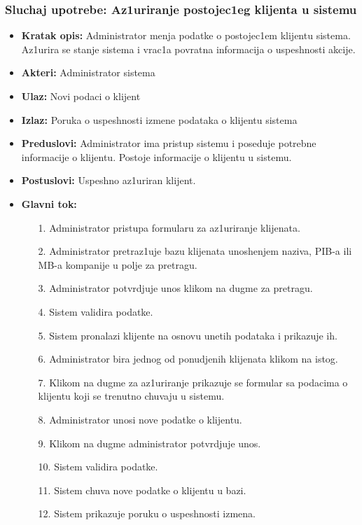 \subsubsection{Sluchaj upotrebe: Az1uriranje postojec1eg klijenta u sistemu}

\begin{itemize}
\item{\textbf{Kratak opis:} Administrator menja podatke o postojec1em klijentu sistema. Az1urira se stanje sistema i vrac1a povratna informacija o uspeshnosti akcije.}
\item{\textbf{Akteri:} Administrator sistema}
\item{\textbf{Ulaz:} Novi podaci o klijent }
\item{\textbf{Izlaz:} Poruka o uspeshnosti izmene podataka o  klijentu sistema }
\item{\textbf{Preduslovi:} Administrator ima pristup sistemu i poseduje potrebne informacije o klijentu. Postoje informacije o klijentu u sistemu.}
\item{\textbf{Postuslovi:} Uspeshno az1uriran klijent.}
\item{\textbf{Glavni tok:} 
\begin{enumerate}
    \item [1.] Administrator pristupa formularu za az1uriranje klijenata.
    \item[2.] Administrator pretraz1uje bazu klijenata unoshenjem naziva, PIB-a ili MB-a kompanije u polje za pretragu.
    \item[3.] Administrator potvrdjuje unos klikom na dugme za pretragu.
    \item[4.] Sistem validira podatke.
    \item[5.] Sistem pronalazi klijente na osnovu unetih podataka i prikazuje ih.
    \item[6.] Administrator bira jednog od ponudjenih klijenata klikom na istog.
    \item[7.] Klikom na dugme za az1uriranje prikazuje se formular sa podacima o klijentu koji se trenutno chuvaju u sistemu.
    \item[8.] Administrator unosi nove podatke o klijentu.
    \item[9.] Klikom na dugme administrator potvrdjuje unos.
    \item[10.] Sistem validira podatke.
    \item[11.] Sistem chuva nove podatke o klijentu u bazi.
    \item[12.] Sistem prikazuje poruku o uspeshnosti izmena.
\end{enumerate}

}
\end{itemize}
